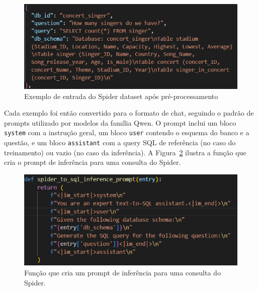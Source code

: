 \documentclass[journal,onecolumn]{IEEEtran}
\newcommand{\figwidth}{0.7\linewidth}
\begin{document}
\begin{figure}[!htpb]
    \centering
    \includegraphics[width=\figwidth]{resources/spider_processed.png}
    \caption{Exemplo de entrada do Spider dataset após pré-processamento}
    \label{fig:spider_processed}
\end{figure}

Cada exemplo foi então convertido para o formato de chat, seguindo o padrão de prompts utilizado por modelos da família Qwen. O prompt inclui um bloco \texttt{system} com a instrução geral, um bloco \texttt{user} contendo o esquema do banco e a questão, e um bloco \texttt{assistant} com a query SQL de referência (no caso do treinamento) ou vazio (no caso da inferência). A Figura~\ref{fig:spider_prompt} ilustra a função que cria o prompt de inferência para uma consulta do Spider.

\begin{figure}[!htpb]
    \centering
    \includegraphics[width=\figwidth]{resources/spider_prompt.png}
    \caption{Função que cria um prompt de inferência para uma consulta do Spider.}
    \label{fig:spider_prompt}
\end{figure}
\end{document}
